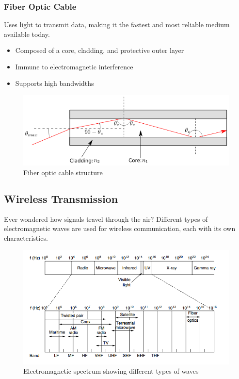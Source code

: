 \newpage
\subsubsection*{Fiber Optic Cable}
Uses light to transmit data, making it the fastest and most reliable medium available today.

\begin{itemize}
    \item Composed of a core, cladding, and protective outer layer
    \item Immune to electromagnetic interference
    \item Supports high bandwidths
\end{itemize}

\begin{figure}
    \centering
    \includegraphics[width=.8\textwidth]{assets/osi/physical/fiber.png}
    \caption{Fiber optic cable structure}\label{fig:fiber_optic}
\end{figure}

\vspace{1em}

\subsection*{Wireless Transmission}
Ever wondered how signals travel through the air? Different types of electromagnetic waves are used for wireless communication, each with its own characteristics.

\begin{figure}[h]
    \centering
    \includegraphics[width=.8\textwidth]{assets/osi/physical/spectrum.png}
    \caption{Electromagnetic spectrum showing different types of waves}\label{fig:em_spectrum}
\end{figure}

